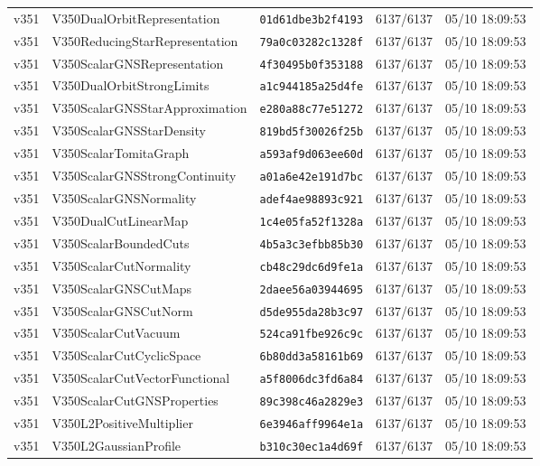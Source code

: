 \documentclass[11pt]{article}
\theoremstyle{definition}\newtheorem{deriv}{Derivation}
\begin{document}
{\begin{longtable}{@{}lllll@{}}
v351 & V350DualOrbitRepresentation & \texttt{01d61dbe3b2f4193} & 6137/6137 & 05/10 18:09:53 \\
v351 & V350ReducingStarRepresentation & \texttt{79a0c03282c1328f} & 6137/6137 & 05/10 18:09:53 \\
v351 & V350ScalarGNSRepresentation & \texttt{4f30495b0f353188} & 6137/6137 & 05/10 18:09:53 \\
v351 & V350DualOrbitStrongLimits & \texttt{a1c944185a25d4fe} & 6137/6137 & 05/10 18:09:53 \\
v351 & V350ScalarGNSStarApproximation & \texttt{e280a88c77e51272} & 6137/6137 & 05/10 18:09:53 \\
v351 & V350ScalarGNSStarDensity & \texttt{819bd5f30026f25b} & 6137/6137 & 05/10 18:09:53 \\
v351 & V350ScalarTomitaGraph & \texttt{a593af9d063ee60d} & 6137/6137 & 05/10 18:09:53 \\
v351 & V350ScalarGNSStrongContinuity & \texttt{a01a6e42e191d7bc} & 6137/6137 & 05/10 18:09:53 \\
v351 & V350ScalarGNSNormality & \texttt{adef4ae98893c921} & 6137/6137 & 05/10 18:09:53 \\
v351 & V350DualCutLinearMap & \texttt{1c4e05fa52f1328a} & 6137/6137 & 05/10 18:09:53 \\
v351 & V350ScalarBoundedCuts & \texttt{4b5a3c3efbb85b30} & 6137/6137 & 05/10 18:09:53 \\
v351 & V350ScalarCutNormality & \texttt{cb48c29dc6d9fe1a} & 6137/6137 & 05/10 18:09:53 \\
v351 & V350ScalarGNSCutMaps & \texttt{2daee56a03944695} & 6137/6137 & 05/10 18:09:53 \\
v351 & V350ScalarGNSCutNorm & \texttt{d5de955da28b3c97} & 6137/6137 & 05/10 18:09:53 \\
v351 & V350ScalarCutVacuum & \texttt{524ca91fbe926c9c} & 6137/6137 & 05/10 18:09:53 \\
v351 & V350ScalarCutCyclicSpace & \texttt{6b80dd3a58161b69} & 6137/6137 & 05/10 18:09:53 \\
v351 & V350ScalarCutVectorFunctional & \texttt{a5f8006dc3fd6a84} & 6137/6137 & 05/10 18:09:53 \\
v351 & V350ScalarCutGNSProperties & \texttt{89c398c46a2829e3} & 6137/6137 & 05/10 18:09:53 \\
v351 & V350L2PositiveMultiplier & \texttt{6e3946aff9964e1a} & 6137/6137 & 05/10 18:09:53 \\
v351 & V350L2GaussianProfile & \texttt{b310c30ec1a4d69f} & 6137/6137 & 05/10 18:09:53 \\

\end{longtable}}
\end{document}
